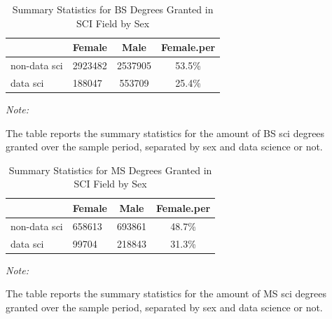 \documentclass[
  12pt,
]{article}
\begin{document}
\begin{table}[H]

\caption{\label{tab:unnamed-chunk-13}Summary Statistics for BS Degrees Granted in SCI Field by Sex}
\centering
\begin{threeparttable}
\begin{tabular}[t]{llcc}
\toprule
  & Female & Male & Female.per\\
\midrule
non-data sci & 2923482 & 2537905 & 53.5\%\\
data sci & 188047 & 553709 & 25.4\%\\
\bottomrule
\end{tabular}
\begin{tablenotes}
\item \textit{Note: } 
\item The table reports the summary statistics for the amount of BS sci degrees granted over the sample period, separated by sex and data science or not.
\end{tablenotes}
\end{threeparttable}
\end{table}

\begin{table}[H]

\caption{\label{tab:unnamed-chunk-13}Summary Statistics for MS Degrees Granted in SCI Field by Sex}
\centering
\begin{threeparttable}
\begin{tabular}[t]{llcc}
\toprule
  & Female & Male & Female.per\\
\midrule
non-data sci & 658613 & 693861 & 48.7\%\\
data sci & 99704 & 218843 & 31.3\%\\
\bottomrule
\end{tabular}
\begin{tablenotes}
\item \textit{Note: } 
\item The table reports the summary statistics for the amount of MS sci degrees granted over the sample period, separated by sex and data science or not.
\end{tablenotes}
\end{threeparttable}
\end{table}
\end{document}
